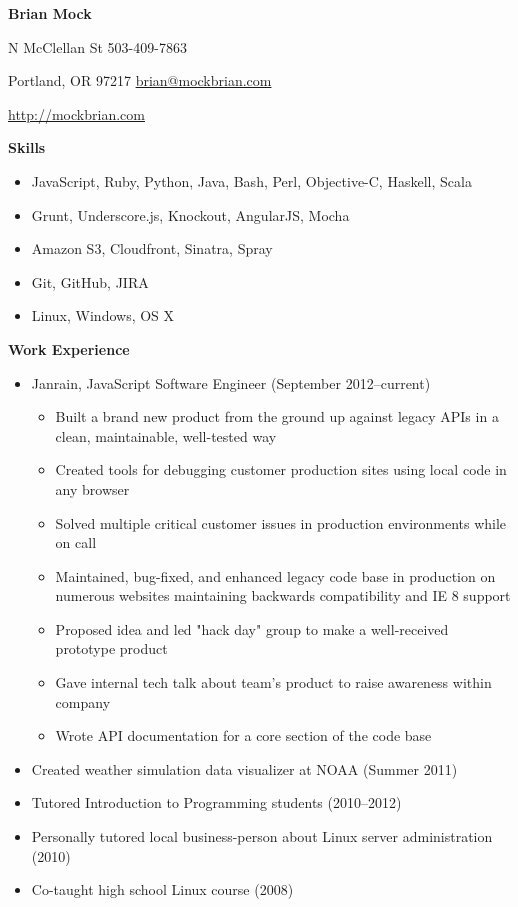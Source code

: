 \documentclass[10pt]{article}
\begin{document}
\noindent
\begin{center}
\textbf{\Large Brian Mock}
\end{center}

 N McClellan St
\hfill
503-409-7863

\noindent
Portland, OR 97217
\hfill
\url{brian@mockbrian.com}

\noindent
\hfill
\url{http://mockbrian.com}

\bigskip
\smallskip

\noindent \textbf{Skills} \hrulefill
\begin{itemize}
\item JavaScript, Ruby, Python, Java, Bash, Perl, Objective-C, Haskell,
Scala
\item Grunt, Underscore.js, Knockout, AngularJS, Mocha
\item Amazon S3, Cloudfront, Sinatra, Spray
\item Git, GitHub, JIRA
\item Linux, Windows, OS X
\end{itemize}

\medskip
\noindent \textbf{Work Experience} \hrulefill
\begin{itemize}
\item Janrain, JavaScript Software Engineer  (September 2012\---current)
    \begin{itemize}
    \item Built a brand new product from the ground up against legacy
    APIs in a clean, maintainable, well-tested way
    \item Created tools for debugging customer production sites using
    local code in any browser
    \item Solved multiple critical customer issues in production
    environments while on call
    \item Maintained, bug-fixed, and enhanced legacy code base in
    production on numerous websites maintaining backwards compatibility
    and IE 8 support
    \item Proposed idea and led "hack day" group to make a well-received
    prototype product
    \item Gave internal tech talk about team's product to raise
    awareness within company
    \item Wrote API documentation for a core section of the code base
    \end{itemize}
\item Created weather simulation data visualizer at NOAA (Summer 2011)
\item Tutored Introduction to Programming students (2010\---2012)
\item Personally tutored local business-person about Linux server
administration (2010)
\item Co-taught high school Linux course (2008)
\end{itemize}
\end{document}
